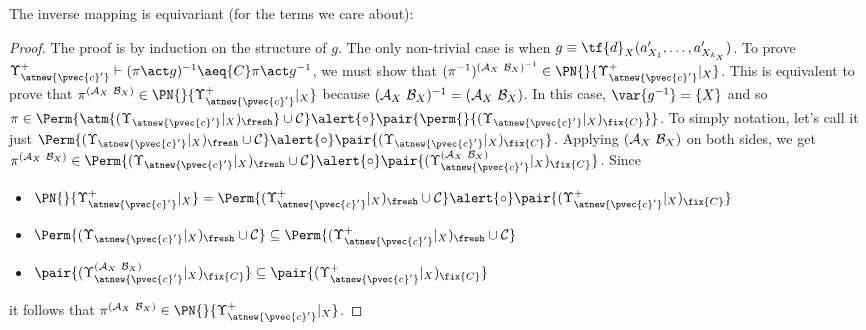 The inverse mapping is equivariant (for the terms we care about):

\begin{lemma}\label{alemma:equivariance-for-completeness}
\end{lemma}

\begin{proof}
The proof is by induction on the structure of $g$. The only non-trivial case is when $g \equiv \tf{d}_X(a_{X_1}',\ldots,a_{X_{k_X}}')$. To prove $\Upsilon^+_{\atnew{\pvec{c}'}} \vdash  (\pi\act g)^{-1} \aeq{C} \pi\act g^{-1}$, we must show that $(\pi^{-1})^{({\cal A}_X \ {\cal B}_X)^{-1}} \in \PN{}{\Upsilon^+_{\atnew{\pvec{c}'}}|_X} $. This is equivalent to prove that $\pi^{({\cal A}_X \ {\cal B}_X)} \in \PN{}{\Upsilon^+_{\atnew{\pvec{c}'}}|_X}$ because $({\cal A}_X \ {\cal B}_X)^{-1} = ({\cal A}_X \ {\cal B}_X)$. In this case, $\var{g^{-1}} = \{X\}$ and so $\pi\in \Perm{\atm{(\Upsilon_{\atnew{\pvec{c}'}}|_X)_{\fresh}}\cup{\cal C}}\alert{\circ}\pair{\perm{}{(\Upsilon_{\atnew{\pvec{c}'}}|_X)_{\fix{C}}}}$. To simply notation, let's call it just $\Perm{(\Upsilon_{\atnew{\pvec{c}'}}|_X)_{\fresh}\cup{\cal C}}\alert{\circ}\pair{(\Upsilon_{\atnew{\pvec{c}'}}|_X)_{\fix{C}}}$. Applying $({\cal A}_X \ {\cal B}_X)$ on both sides, we get $\pi^{({\cal A}_X \ {\cal B}_X)}\in  \Perm{(\Upsilon_{\atnew{\pvec{c}'}}|_X)_{\fresh}\cup{\cal C}}\alert{\circ}\pair{(\Upsilon_{\atnew{\pvec{c}'}}^{({\cal A}_X \ {\cal B}_X)}|_X)_{\fix{C}}}$. Since
\begin{itemize}
    \item $\PN{}{\Upsilon^+_{\atnew{\pvec{c}'}}|_X} =  \Perm{(\Upsilon^+_{\atnew{\pvec{c}'}}|_X)_{\fresh}\cup{\cal C}}\alert{\circ}\pair{(\Upsilon_{\atnew{\pvec{c}'}}^+|_X)_{\fix{C}}}$
    \item $\Perm{(\Upsilon_{\atnew{\pvec{c}'}}|_X)_{\fresh}\cup{\cal C}} \subseteq \Perm{(\Upsilon^+_{\atnew{\pvec{c}'}}|_X)_{\fresh}\cup{\cal C}}$
    \item $\pair{(\Upsilon_{\atnew{\pvec{c}'}}^{({\cal A}_X \ {\cal B}_X)}|_X)_{\fix{C}}} \subseteq \pair{(\Upsilon_{\atnew{\pvec{c}'}}^+|_X)_{\fix{C}}}$
\end{itemize}
it follows that $\pi^{({\cal A}_X \ {\cal B}_X)} \in  \PN{}{\Upsilon^+_{\atnew{\pvec{c}'}}|_X}$.
\end{proof}


